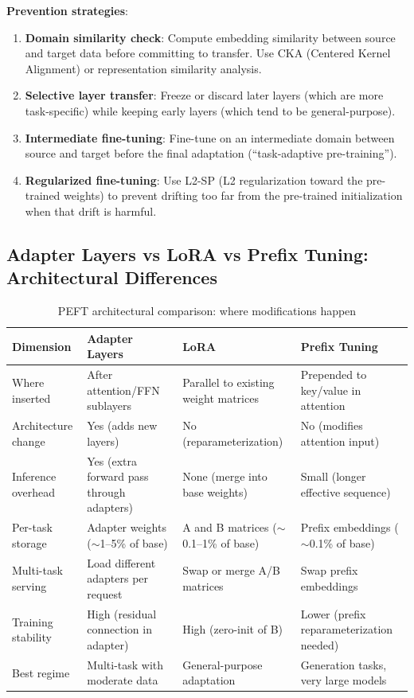 \textbf{Prevention strategies}:
\begin{enumerate}
    \item \textbf{Domain similarity check}: Compute embedding similarity between source and target data before committing to transfer. Use CKA (Centered Kernel Alignment) or representation similarity analysis.
    \item \textbf{Selective layer transfer}: Freeze or discard later layers (which are more task-specific) while keeping early layers (which tend to be general-purpose).
    \item \textbf{Intermediate fine-tuning}: Fine-tune on an intermediate domain between source and target before the final adaptation (``task-adaptive pre-training'').
    \item \textbf{Regularized fine-tuning}: Use L2-SP (L2 regularization toward the pre-trained weights) to prevent drifting too far from the pre-trained initialization when that drift is harmful.
\end{enumerate}

\subsection{Adapter Layers vs LoRA vs Prefix Tuning: Architectural Differences}

\begin{table}[H]
\centering
\caption{PEFT architectural comparison: where modifications happen}
\begin{tabularx}{\textwidth}{lXXX}
\toprule
\textbf{Dimension} & \textbf{Adapter Layers} & \textbf{LoRA} & \textbf{Prefix Tuning} \\
\midrule
Where inserted & After attention/FFN sublayers & Parallel to existing weight matrices & Prepended to key/value in attention \\
Architecture change & Yes (adds new layers) & No (reparameterization) & No (modifies attention input) \\
Inference overhead & Yes (extra forward pass through adapters) & None (merge into base weights) & Small (longer effective sequence) \\
Per-task storage & Adapter weights ($\sim$1--5\% of base) & A and B matrices ($\sim$0.1--1\% of base) & Prefix embeddings ($\sim$0.1\% of base) \\
Multi-task serving & Load different adapters per request & Swap or merge A/B matrices & Swap prefix embeddings \\
Training stability & High (residual connection in adapter) & High (zero-init of B) & Lower (prefix reparameterization needed) \\
Best regime & Multi-task with moderate data & General-purpose adaptation & Generation tasks, very large models \\
\bottomrule
\end{tabularx}
\end{table}

